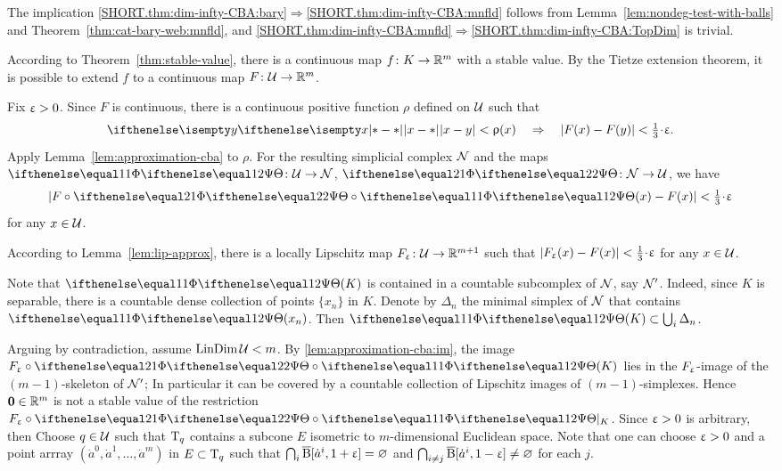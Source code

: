 The implication \ref{SHORT.thm:dim-infty-CBA:bary}$\Rightarrow$\ref{SHORT.thm:dim-infty-CBA:mnfld} follows from Lemma~\ref{lem:nondeg-test-with-balls}
and Theorem~\ref{thm:cat-bary-web:mnfld}, and \ref{SHORT.thm:dim-infty-CBA:mnfld}$\Rightarrow$\ref{SHORT.thm:dim-infty-CBA:TopDim} is trivial.
 
According to Theorem~\ref{thm:stable-value}, 
there is a continuous map $f\:K\to \RR^{m}$ with a stable value.
By the Tietze extension theorem, it is possible to extend $f$ 
to a continuous map $F\:\spc{U}\to \RR^{m}$.

Fix $\upvarepsilon>0$.
Since $F$ is continuous, there is a continuous positive function $\rho$ defined on $\mathcal{U}$ such that 
\[\dist{x}{y}{}<\rho(x)
\quad\Rightarrow\quad
|F(x)- F(y)|<\tfrac13\cdot\eps.\]
Apply Lemma~\ref{lem:approximation-cba} to $\rho$.
For the resulting simplicial complex $\mathcal{N}$ 
 and the maps $\map\:\spc{U}\to \spc{N}$, $\map[2]\:\spc{N}\to \spc{U}$, we have
\[|F\circ \map[2]\circ\map(x)-F(x)|<\tfrac13\cdot\eps\] 
for any $x\in \spc{U}$.

According to Lemma~\ref{lem:lip-approx},
there is a locally Lipschitz map $F_\eps\:\spc{U}\to \RR^{m+1}$ 
such that $|F_\eps(x)-F(x)|<\tfrac13\cdot\eps$ for any $x\in \spc{U}$.

Note that
$\map(K)$ is contained in a countable subcomplex of $\mathcal{N}$, say $\mathcal{N}'$.
Indeed, since $K$ is separable, there is a countable dense collection of points $\{x_n\}$ in $K$.
Denote by $\Delta_n$ the minimal simplex of $\mathcal{N}$ that contains $\map(x_n)$.
Then $\map(K)\subset\bigcup_i\Delta_n$.

Arguing by contradiction,
assume $\mathop{\rm LinDim}\nolimits\mathcal{U}<m$.
By \ref{lem:approximation-cba:im},
the image $F_\eps\circ\map[2]\circ\map(K)$ lies in the $F_\upvarepsilon$-image of the $(m-1)$-skeleton of $\mathcal{N}'$;
In particular it can be covered 
by a countable collection of Lipschitz images of $(m-1)$-simplexes.
Hence
$\bm{0}\in \RR^m$ is not a stable value of the restriction $F_\eps\circ\map[2]\circ\map|_K$.
Since $\upvarepsilon>0$ is arbitrary, 
then
Choose $q\in \spc{U}$ such that $\text{\rm T}_q$ contains a subcone $E$ isometric to $m$-dimensional Euclidean space.
Note that one can choose $\upvarepsilon>0$ 
and a point arrray $(\dot a^0,\dot a^1,\dots,\dot a^m)$ in $E\subset \T_q$ 
such that 
$\bigcap_i\overline{\mathrm{B}}{}[\dot a^i,1+\upvarepsilon]=\varnothing$
and $\bigcap_{i\ne j}\cBall[\dot a^i,1\z-\eps]\z{\ne }\emptyset$ for each $j$.

